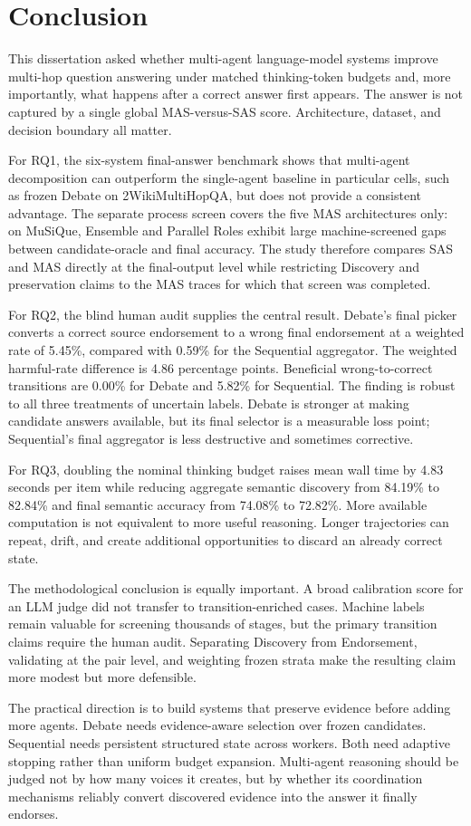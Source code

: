 \chapter{Conclusion}
\label{chap:conclusion}

This dissertation asked whether multi-agent language-model systems improve multi-hop question answering under matched thinking-token budgets and, more importantly, what happens after a correct answer first appears. The answer is not captured by a single global MAS-versus-SAS score. Architecture, dataset, and decision boundary all matter.

For RQ1, the six-system final-answer benchmark shows that multi-agent decomposition can outperform the single-agent baseline in particular cells, such as frozen Debate on 2WikiMultiHopQA, but does not provide a consistent advantage. The separate process screen covers the five MAS architectures only: on MuSiQue, Ensemble and Parallel Roles exhibit large machine-screened gaps between candidate-oracle and final accuracy. The study therefore compares SAS and MAS directly at the final-output level while restricting Discovery and preservation claims to the MAS traces for which that screen was completed.

For RQ2, the blind human audit supplies the central result. Debate's final picker converts a correct source endorsement to a wrong final endorsement at a weighted rate of 5.45\%, compared with 0.59\% for the Sequential aggregator. The weighted harmful-rate difference is 4.86 percentage points. Beneficial wrong-to-correct transitions are 0.00\% for Debate and 5.82\% for Sequential. The finding is robust to all three treatments of uncertain labels. Debate is stronger at making candidate answers available, but its final selector is a measurable loss point; Sequential's final aggregator is less destructive and sometimes corrective.

For RQ3, doubling the nominal thinking budget raises mean wall time by 4.83 seconds per item while reducing aggregate semantic discovery from 84.19\% to 82.84\% and final semantic accuracy from 74.08\% to 72.82\%. More available computation is not equivalent to more useful reasoning. Longer trajectories can repeat, drift, and create additional opportunities to discard an already correct state.

The methodological conclusion is equally important. A broad calibration score for an LLM judge did not transfer to transition-enriched cases. Machine labels remain valuable for screening thousands of stages, but the primary transition claims require the human audit. Separating Discovery from Endorsement, validating at the pair level, and weighting frozen strata make the resulting claim more modest but more defensible.

The practical direction is to build systems that preserve evidence before adding more agents. Debate needs evidence-aware selection over frozen candidates. Sequential needs persistent structured state across workers. Both need adaptive stopping rather than uniform budget expansion. Multi-agent reasoning should be judged not by how many voices it creates, but by whether its coordination mechanisms reliably convert discovered evidence into the answer it finally endorses.
